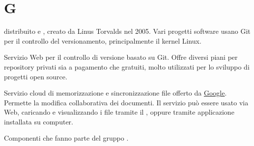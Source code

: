 \section{G}

 distribuito e , creato da Linus Torvalds nel 2005.
Vari progetti software usano Git per il controllo del versionamento, principalmente il kernel Linux.

Servizio Web per il controllo di versione basato su Git. Offre diversi piani per repository privati sia a pagamento che gratuiti, molto utilizzati per lo sviluppo di progetti open source.

Servizio cloud di memorizzazione e sincronizzazione file offerto da \href{https://www.google.it}{Google}. Permette la modifica collaborativa dei documenti. Il servizio può essere usato via Web, caricando e visualizzando i file tramite il , oppure tramite applicazione installata su computer.

Componenti che fanno parte del gruppo \zephyrus.




